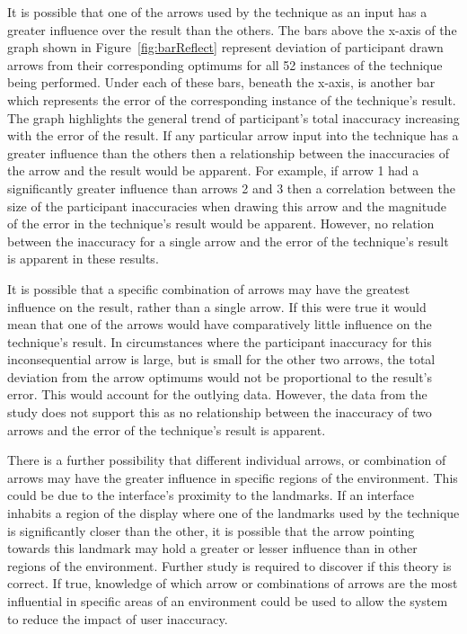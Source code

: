 \documentclass{bmcart}
\begin{document}
It is possible that one of the arrows used by the technique as an input has a greater influence over the result than the others.
The bars above the x-axis of the graph shown in Figure~\ref{fig:barReflect} represent deviation of participant drawn arrows from their corresponding optimums for all 52 instances of the technique being performed.
Under each of these bars, beneath the x-axis, is another bar which represents the error of the corresponding instance of the technique's result.
The graph highlights the general trend of participant's total inaccuracy increasing with the error of the result.
If any particular arrow input into the technique has a greater influence than the others then a relationship between the inaccuracies of the arrow and the result would be apparent.
For example, if arrow 1 had a significantly greater influence than arrows 2 and 3 then a correlation between the size of the participant inaccuracies when drawing this arrow and the magnitude of the error in the technique's result would be apparent.
However, no relation between the inaccuracy for a single arrow and the error of the technique's result is apparent in these results.

It is possible that a specific combination of arrows may have the greatest influence on the result, rather than a single arrow.
If this were true it would mean that one of the arrows would have comparatively little influence on the technique's result.
In circumstances where the participant inaccuracy for this inconsequential arrow is large, but is small for the other two arrows, the total deviation from the arrow optimums would not be proportional to the result's error.
This would account for the outlying data.
However, the data from the study does not support this as no relationship between the inaccuracy of two arrows and the error of the technique's result is apparent.

There is a further possibility that different individual arrows, or combination of arrows may have the greater influence in specific regions of the environment.
This could be due to the interface's proximity to the landmarks.
If an interface inhabits a region of the display where one of the landmarks used by the technique is significantly closer than the other, it is possible that the arrow pointing towards this landmark may hold a greater or lesser influence than in other regions of the environment.
Further study is required to discover if this theory is correct.
If true, knowledge of which arrow or combinations of arrows are the most influential in specific areas of an environment could be used to allow the system to reduce the impact of user inaccuracy.
\end{document}
